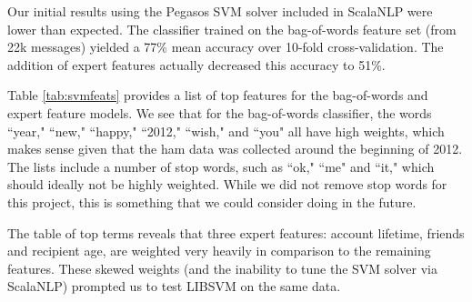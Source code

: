 \documentclass[preprint]{acm_proc_article-sp}
\begin{document}
Our initial results using the Pegasos SVM solver included in ScalaNLP were lower than expected. The 
classifier trained on the bag-of-words feature set (from 22k messages) yielded a 77\% mean accuracy 
over 10-fold cross-validation. The addition of expert features actually decreased this accuracy to 
51\%. 

Table \ref{tab:svmfeats} provides a list of top features for the bag-of-words and expert 
feature models. We see that for the bag-of-words classifier, the words ``year," ``new," ``happy,"  
``2012," ``wish," and ``you" all have high weights, which makes sense given that the ham data was 
collected around the beginning of 2012. The lists include a number of stop words, such as ``ok," 
``me" and ``it," which should ideally not be highly weighted. While we did not remove stop words for this 
project, this is something that we could consider doing in the future. 

The table of top terms reveals that three expert features: account lifetime, friends and 
recipient age, are weighted very heavily in comparison to the remaining features. These 
skewed weights (and the inability to tune the SVM solver via ScalaNLP) prompted us to test LIBSVM 
on the same data.
\end{document}
